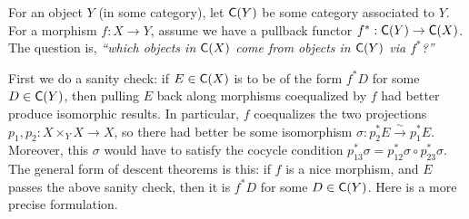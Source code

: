 
For an object $Y$ (in some category), let $\text{\sf C}(Y)$ be some category associated to $Y$. For a morphism $f:X\to Y$, assume we have a pullback functor $f^*:\text{\sf C}(Y)\to \text{\sf C}(X)$. The question is, \emph{``which objects in $\text{\sf C}(X)$ come from objects in $\text{\sf C}(Y)$ via $f^*$?''}

First we do a sanity check: if $E\in \text{\sf C}(X)$ is to be of the form $f^*D$ for some $D\in \text{\sf C}(Y)$, then pulling $E$ back along morphisms coequalized by $f$ had better produce isomorphic results. In particular, $f$ coequalizes the two projections $p_1,p_2:X\times_Y X\to X$, so there had better be some isomorphism $\sigma: p_2^*E\xrightarrow\sim p_1^* E$. Moreover, this $\sigma$ would have to satisfy the cocycle condition $p_{13}^* \sigma = p_{12}^*\sigma \circ p_{23}^* \sigma$. The general form of descent theorems is this: if $f$ is a nice morphism, and $E$ passes the above sanity check, then it is $f^*D$ for some $D\in \text{\sf C}(Y)$. Here is a more precise formulation.

